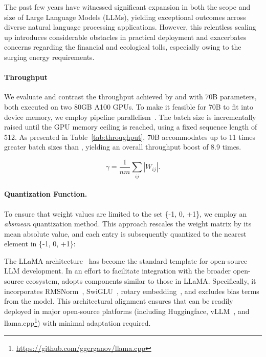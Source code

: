 The past few years have witnessed significant expansion in both the scope and size of Large Language Models (LLMs), yielding exceptional outcomes across diverse natural language processing applications. However, this relentless scaling up introduces considerable obstacles in practical deployment and exacerbates concerns regarding the financial and ecological tolls, especially owing to the surging energy requirements.

\paragraph{Throughput}

We evaluate and contrast the throughput achieved by  and  with 70B parameters, both executed on two 80GB A100 GPUs. To make it feasible for  70B to fit into device memory, we employ pipeline parallelism~\cite{gpipe}. The batch size is incrementally raised until the GPU memory ceiling is reached, using a fixed sequence length of 512. As presented in Table~\ref{tab:throughput},  70B accommodates up to 11 times greater batch sizes than , yielding an overall throughput boost of 8.9 times.

\begin{equation}
    \gamma = \frac{1}{nm}\sum_{ij} |W_{ij}|.
\end{equation}

\paragraph{Quantization Function.} To ensure that weight values are limited to the set \{-1, 0, +1\}, we employ an \emph{absmean} quantization method. This approach rescales the weight matrix by its mean absolute value, and each entry is subsequently quantized to the nearest element in \{-1, 0, +1\}:

The LLaMA architecture~\cite{llama, llama2} has become the standard template for open-source LLM development. In an effort to facilitate integration with the broader open-source ecosystem,  adopts components similar to those in LLaMA. Specifically, it incorporates RMSNorm~\cite{rmsnorm}, SwiGLU~\cite{swiglu}, rotary embedding~\cite{rope}, and excludes bias terms from the model. This architectural alignment ensures that  can be readily deployed in major open-source platforms (including Huggingface, vLLM~\cite{vllm}, and llama.cpp\footnote{\url{https://github.com/ggerganov/llama.cpp}}) with minimal adaptation required.

